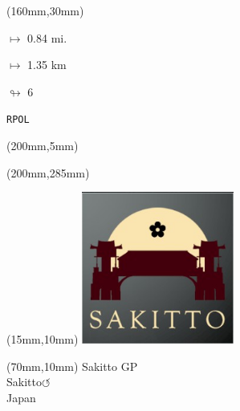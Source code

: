 \begin{textblock*}{40mm}(160mm,30mm)%
\Large
\par$\mapsto$ 0.84 mi.
\par$\mapsto$ 1.35 km
\par$\looparrowright$ 6
\par\hfill\tiny\tt RPOL\\
\end{textblock*}
\begin{textblock*}{20mm}(200mm,5mm)%
\fbox{\thepage}
\label{RPOL}
\end{textblock*}
\begin{textblock*}{20mm}(200mm,285mm)%
\fbox{\thepage}
\end{textblock*}

\null\newpage
\begin{textblock*}{50mm}(15mm,10mm)%
\includegraphics[width=50mm]{LG/2015-05-20_00093.png}
\end{textblock*}
\begin{textblock*}{130mm}(70mm,10mm)%
{\fontsize{20}{20}\selectfont Sakitto GP\\}
{\fontsize{16}{16}\selectfont Sakitto\hfill \huge$\circlearrowleft$\\}
{\fontsize{12}{12}\selectfont Japan\\}
\end{textblock*}
